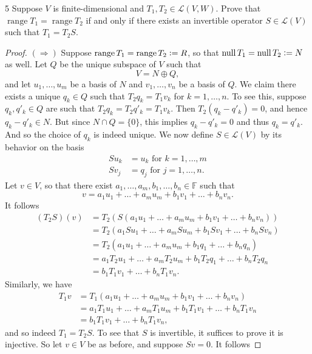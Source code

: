 \documentclass{extarticle}
\newenvironment{problem}[1]{\begin{prob*}{#1}{}}{\end{prob*}}
\newcommand{\F}{\mathbb{F}}
\newcommand{\Hom}{\mathcal{L}}
\DeclareMathOperator{\Null}{null}
\DeclareMathOperator{\Range}{range}
\newcommand{\defeq}{\vcentcolon=}
\begin{document}
\begin{problem}{5}
Suppose $V$ is finite-dimensional and $T_1,T_2\in\Hom(V,W)$.  Prove that $\Range T_1 = \Range T_2$ if and only if there exists an invertible operator $S\in\Hom(V)$ such that $T_1=T_2S$.  
\end{problem}
\begin{proof}
$(\Rightarrow)$ Suppose $\Range T_1=\Range T_2 \defeq R$, so that $\Null T_1 = \Null T_2\defeq N$ as well.  Let $Q$ be the unique subspace of $V$ such that
\begin{equation*}
V = N \oplus Q,
\end{equation*}
and let $u_1,\dots,u_m$ be a basis of $N$ and $v_1,\dots,v_n$ be a basis of $Q$.  We claim there exists a unique $q_k\in Q$ such that $T_2q_k = T_1v_k$ for $k = 1,\dots, n$.  To see this, suppose $q_k,q'_k\in Q$ are such that $T_2q_k = T_2q'_k = T_1v_k$.  Then $T_2(q_k - q'_k) = 0$, and hence $q_k - q'_k \in N$.  But since $N\cap Q = \{0\}$, this implies $q_k - q'_k = 0$ and thus $q_k = q'_k$.  And so the choice of $q_k$ is indeed unique.  We now define $S\in\Hom(V)$ by its behavior on the basis
\begin{align*}
Su_k &= u_k \text{ for } k = 1,\dots,m\\
Sv_j &= q_j \text{ for }j = 1,\dots,n.
\end{align*}
Let $v\in V$, so that there exist $a_1,\dots, a_m,b_1,\dots,b_n\in\F$ such that 
\begin{equation*}
v = a_1u_1 + \dots + a_mu_m + b_1v_1 + \dots + b_nv_n.
\end{equation*}
It follows
\begin{align*}
(T_2S)(v) &= T_2(S(a_1u_1 + \dots + a_mu_m + b_1v_1 + \dots + b_nv_n))\\
&= T_2(a_1Su_1 + \dots + a_mSu_m + b_1Sv_1 + \dots + b_nSv_n)\\
&= T_2(a_1u_1 + \dots + a_mu_m + b_1q_1 + \dots + b_nq_n)\\
&= a_1T_2u_1 + \dots + a_mT_2u_m + b_1T_2q_1 + \dots + b_nT_2q_n\\
&= b_1T_1v_1 + \dots + b_nT_1v_n.
\end{align*}
Similarly, we have
\begin{align*}
T_1v &= T_1(a_1u_1 + \dots + a_mu_m + b_1v_1 + \dots + b_nv_n)\\
&= a_1T_1u_1 + \dots + a_mT_1u_m + b_1T_1v_1 + \dots + b_nT_1v_n\\
&= b_1T_1v_1 + \dots + b_nT_1v_n,
\end{align*}
and so indeed $T_1 = T_2S$.  To see that $S$ is invertible, it suffices to prove it is injective.  So let $v\in V$ be as before, and suppose $Sv = 0$.  It follows

\end{proof}
\end{document}
